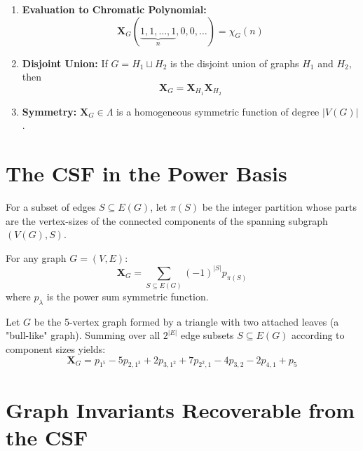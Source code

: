 \documentclass[12pt]{memoir}
\begin{document}
\begin{ptcb}
\begin{Prop}
\begin{enumerate}
    \item \textbf{Evaluation to Chromatic Polynomial:} 
    \[
    \mathbf{X}_G(\underbrace{1, 1, \dots, 1}_{n}, 0, 0, \dots) = \chi_G(n)
    \]
    \item \textbf{Disjoint Union:} If $G = H_1 \sqcup H_2$ is the disjoint union of graphs $H_1$ and $H_2$, then
    \[
    \mathbf{X}_G = \mathbf{X}_{H_1} \mathbf{X}_{H_2}
    \]
    \item \textbf{Symmetry:} $\mathbf{X}_G \in \Lambda$ is a homogeneous symmetric function of degree $|V(G)|$.
\end{enumerate}
\end{Prop}
\end{ptcb}

\newpage

\section{The CSF in the Power Basis}

For a subset of edges $S \subseteq E(G)$, let $\pi(S)$ be the integer partition whose parts are the vertex-sizes of the connected components of the spanning subgraph $(V(G), S)$.

\begin{ptcb}
\begin{Th}[Stanley, 1995]
For any graph $G = (V, E)$:
\[
\mathbf{X}_G = \sum_{S \subseteq E(G)} (-1)^{|S|} p_{\pi(S)}
\]
where $p_\lambda$ is the power sum symmetric function.
\end{Th}
\end{ptcb}

\begin{Ex}
Let $G$ be the 5-vertex graph formed by a triangle with two attached leaves (a "bull-like" graph). Summing over all $2^{|E|}$ edge subsets $S \subseteq E(G)$ according to component sizes yields:
\[
\mathbf{X}_G = p_{1^5} - 5 p_{2,1^3} + 2 p_{3,1^2} + 7 p_{2^2,1} - 4 p_{3,2} - 2 p_{4,1} + p_5
\]
\end{Ex}

\newpage

\section{Graph Invariants Recoverable from the CSF}
\end{document}
